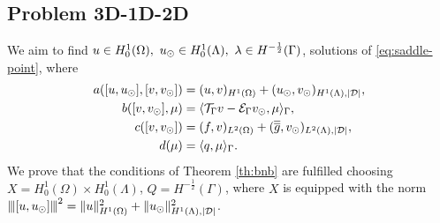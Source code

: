 \documentclass[r]{siamart171218}
\newcommand{\paoloold}[1]{{\color{black}#1}}
\begin{document}
\subsection{Problem 3D-1D-2D}
We aim to find $u \in H^1_0(\Omega),\ u_{\odot} \in H_0^1(\Lambda), \ \lambda \in H^{-\frac12}(\Gamma )$,
solutions of \eqref{eq:saddle-point}, where
\begin{align*}
a([u, \ud], [v, \vd])&= (u,v)_{H^1(\Omega)} + (\ud,\vd)_{H^1(\Lambda),|\D|},
\\
b([v, \vd], \mu)&= \langle \trace v - \ext \vd , \mu \rangle_\Gamma,
\\
c([v,\vd])&= (f,v)_{L^2(\Omega)} + (\avrd{g},\vd)_{L^2(\Lambda),|\D|},
\\
d(\mu)&=\paoloold{\langle q,\mu\rangle_\Gamma}.
\end{align*}
We prove that the conditions of Theorem \ref{th:bnb} are fulfilled choosing 
$X=H^1_0(\Omega) \times H^1_0(\Lambda)$, $Q=H^{-\frac 12}(\Gamma)$, where $X$  is equipped with the norm ${\left\vert\kern-0.25ex\left\vert\kern-0.25ex\left\vert [u,u_{\odot} ] \right\vert\kern-0.25ex\right\vert\kern-0.25ex\right\vert}^2=\|u\|^2_{H^1(\Omega)} + \|u_{\odot}\|^2_{H^1(\Lambda),|\mathcal{D}|}$.
\end{document}
